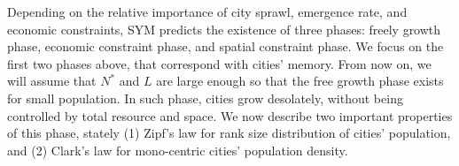 \documentclass[reprint,unsortedaddress,amsmath,amssymb,aps,prl,showkeys]{revtex4-2}
\begin{document}


Depending on the relative importance of city sprawl, emergence rate, and economic constraints, SYM predicts the existence of three phases: freely growth phase, economic constraint phase, and spatial constraint phase. We focus on the first two phases above, that correspond with cities' memory. From now on, we will assume that $N^*$ and $L$ are large enough so that the free growth phase exists for small population. In such phase, cities grow desolately, without being controlled by total resource and space. We now describe two important properties of this phase, stately (1) Zipf's law\cite{gabaix1999zipf's} for rank size distribution of cities' population, and (2) Clark's law for mono-centric cities' population density. 
\end{document}
